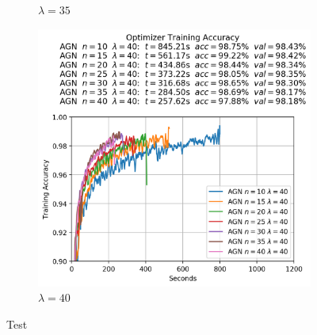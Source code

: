 \begin{figure}
\begin{subfigure}{.3\textwidth}
    \caption{$\lambda = 35$}
  \end{subfigure}
  \begin{subfigure}{.3\textwidth}
    \centering
    \includegraphics[width=\linewidth]{resources/images/agn_experiments_lambda_40}
    \caption{$\lambda = 40$}
  \end{subfigure}
  \caption{Test}
  \label{fig:agn_experiments_lambdas}
\end{figure}

